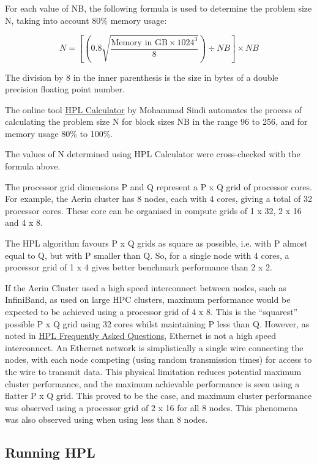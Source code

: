 \documentclass{report}
\begin{document}
For each value of NB, the following formula is used to determine the problem size N, taking into account 80\% memory usage:

\[N = \left[\left(0.8 \sqrt{\frac{\text{Memory in GB} \times 1024^3}{8}}\right) \div NB\right] \times NB\]

The division by 8 in the inner parenthesis is the size in bytes of a double precision floating point number.


The online tool \href{http://hpl-calculator.sourceforge.net}{HPL Calculator} by Mohammad Sindi automates the process of calculating the problem size N for block sizes NB in the range 96 to 256, and for memory usage 80\% to 100\%.

The values of N determined using HPL Calculator were cross-checked with the formula above.

The processor grid dimensions P and Q represent a P x Q grid of processor cores. For example, the Aerin cluster has 8 nodes, each with 4 cores, giving a total of 32 processor cores. These core can be organised in compute grids of 1 x 32, 2 x 16 and 4 x 8.

The HPL algorithm favours P x Q grids as square as possible, i.e. with P almost equal to Q, but with P smaller than Q. So, for a single node with 4 cores, a processor grid of 1 x 4 gives better benchmark performance than 2 x 2.

If the Aerin Cluster used a high speed interconnect between nodes, such as InfiniBand, as used on large HPC clusters, maximum performance would be expected to be achieved using a processor grid of 4 x 8. This is the ``squarest'' possible P x Q grid using 32 cores whilst maintaining P less than Q. However, as noted in \href{https://www.netlib.org/benchmark/hpl/faqs.html}{HPL Frequently Asked Questions}, Ethernet is not a high speed interconnect. An Ethernet network is simplistically a single wire connecting the nodes, with each node competing (using random transmission times) for access to the wire to transmit data. This physical limitation reduces potential maximum cluster performance, and the maximum achievable performance is seen using a flatter P x Q grid. This proved to be the case, and maximum cluster performance was observed using a processor grid of 2 x 16 for all 8 nodes. This phenomena was also observed using when using less than 8 nodes.


%
%
\subsection{Running HPL}
\end{document}
